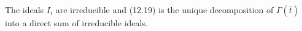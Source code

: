 The ideals $I_i$ are irreducible and (12.19) is the unique decomposition of $\Gamma(\bar{t})$ into a direct sum of irreducible ideals.
